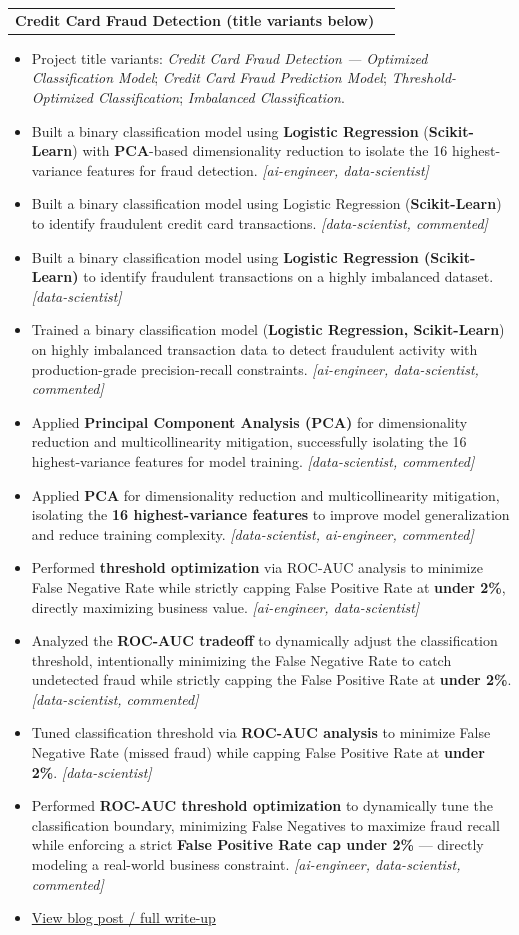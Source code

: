 \documentclass[letterpaper,11pt]{article}
\makeatletter
\newcommand{\resumeItem}[1]{
  \item\small{
    {#1 \vspace{-3pt}}
  }
}
\newcommand{\resumeProjectHeading}[2]{
  \vspace{-3pt}\item
    \begin{tabular*}{1.0\textwidth}[t]{l@{\extracolsep{\fill}}r}
      \textbf{#1} & \textbf{\small #2} \\
    \end{tabular*}\vspace{-7pt}
}
\newcommand{\resumeItemListStart}{\begin{itemize}}
\newcommand{\resumeItemListEnd}{\end{itemize}\vspace{0pt}}
\makeatother
\begin{document}
        \resumeProjectHeading
        {\textbf{Credit Card Fraud Detection (title variants below)}}{}
        \resumeItemListStart
            \resumeItem{Project title variants: \textit{Credit Card Fraud Detection — Optimized Classification Model}; \textit{Credit Card Fraud Prediction Model}; \textit{Threshold-Optimized Classification}; \textit{Imbalanced Classification}.}
            \resumeItem{Built a binary classification model using \textbf{Logistic Regression} (\textbf{Scikit-Learn}) with \textbf{PCA}-based dimensionality reduction to isolate the 16 highest-variance features for fraud detection. \textit{[ai-engineer, data-scientist]}}
            \resumeItem{Built a binary classification model using Logistic Regression (\textbf{Scikit-Learn}) to identify fraudulent credit card transactions. \textit{[data-scientist, commented]}}
            \resumeItem{Built a binary classification model using \textbf{Logistic Regression (Scikit-Learn)} to identify fraudulent transactions on a highly imbalanced dataset. \textit{[data-scientist]}}
            \resumeItem{Trained a binary classification model (\textbf{Logistic Regression, Scikit-Learn}) on highly imbalanced transaction data to detect fraudulent activity with production-grade precision-recall constraints. \textit{[ai-engineer, data-scientist, commented]}}
            \resumeItem{Applied \textbf{Principal Component Analysis (PCA)} for dimensionality reduction and multicollinearity mitigation, successfully isolating the 16 highest-variance features for model training. \textit{[data-scientist, commented]}}
            \resumeItem{Applied \textbf{PCA} for dimensionality reduction and multicollinearity mitigation, isolating the \textbf{16 highest-variance features} to improve model generalization and reduce training complexity. \textit{[data-scientist, ai-engineer, commented]}}
            \resumeItem{Performed \textbf{threshold optimization} via ROC-AUC analysis to minimize False Negative Rate while strictly capping False Positive Rate at \textbf{under 2\%}, directly maximizing business value. \textit{[ai-engineer, data-scientist]}}
            \resumeItem{Analyzed the \textbf{ROC-AUC tradeoff} to dynamically adjust the classification threshold, intentionally minimizing the False Negative Rate to catch undetected fraud while strictly capping the False Positive Rate at \textbf{under 2\%}. \textit{[data-scientist, commented]}}
            \resumeItem{Tuned classification threshold via \textbf{ROC-AUC analysis} to minimize False Negative Rate (missed fraud) while capping False Positive Rate at \textbf{under 2\%}. \textit{[data-scientist]}}
            \resumeItem{Performed \textbf{ROC-AUC threshold optimization} to dynamically tune the classification boundary, minimizing False Negatives to maximize fraud recall while enforcing a strict \textbf{False Positive Rate cap under 2\%} --- directly modeling a real-world business constraint. \textit{[ai-engineer, data-scientist, commented]}}
            \resumeItem{\href{https://brandonminer333.github.io/Credit_Card_Fraud_Project/}{View blog post / full write-up}}
        \resumeItemListEnd
\end{document}
